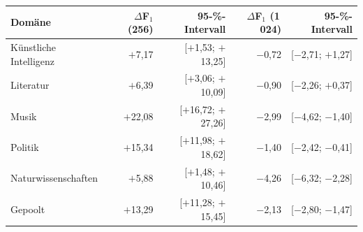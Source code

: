 \begin{tabular}{lrrrr}
    \toprule
    \textbf{Domäne} & $\Delta$F$_1$ (256) & 95-\%-Intervall & $\Delta$F$_1$ (1\,024) & 95-\%-Intervall \\
    \midrule
    K\"unstliche Intelligenz & $+$7,17 & [$+$1,53; $+$13,25] & $-$0,72 & [$-$2,71; $+$1,27] \\
    Literatur & $+$6,39 & [$+$3,06; $+$10,09] & $-$0,90 & [$-$2,26; $+$0,37] \\
    Musik & $+$22,08 & [$+$16,72; $+$27,26] & $-$2,99 & [$-$4,62; $-$1,40] \\
    Politik & $+$15,34 & [$+$11,98; $+$18,62] & $-$1,40 & [$-$2,42; $-$0,41] \\
    Naturwissenschaften & $+$5,88 & [$+$1,48; $+$10,46] & $-$4,26 & [$-$6,32; $-$2,28] \\
    \midrule
    Gepoolt & $+$13,29 & [$+$11,28; $+$15,45] & $-$2,13 & [$-$2,80; $-$1,47] \\
    \bottomrule
\end{tabular}
